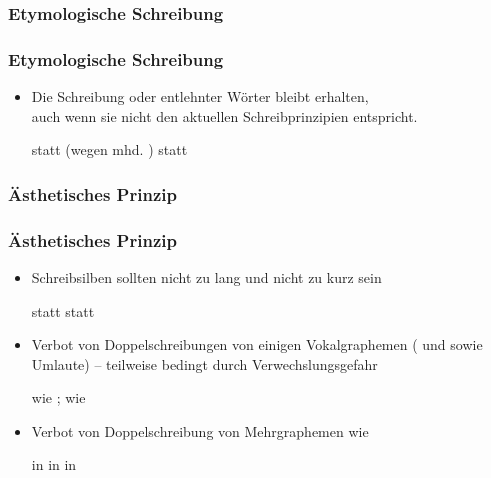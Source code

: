 \subsubsection{Etymologische Schreibung}


\begin{frame}
\frametitle{Etymologische Schreibung}

\begin{itemize}
	\item Die Schreibung  oder entlehnter Wörter bleibt erhalten,\\
          auch wenn sie nicht den aktuellen Schreibprinzipien entspricht.
		
	  \eal
          \ex {} statt  (wegen mhd. )
	  \ex {} statt 
          \zl

\end{itemize}


\end{frame}


\subsubsection{Ästhetisches Prinzip}


\begin{frame}
\frametitle{Ästhetisches Prinzip}

\begin{itemize}
	\item Schreibsilben sollten nicht zu lang und nicht zu kurz sein
	
	  \eal
          \ex {} statt 
	  \ex {} statt 
          \zl
	
	\item Verbot von Doppelschreibungen von einigen Vokalgraphemen ( und  sowie Umlaute) -- teilweise bedingt durch Verwechslungsgefahr
	
	  \ea
           wie ;  wie 
          \z
	
	\item Verbot von Doppelschreibung von Mehrgraphemen wie
	
	  \eal
          \ex {} in 
	  \ex {} in  
	  \ex {} in 
          \zl
	
\end{itemize}


\end{frame}



